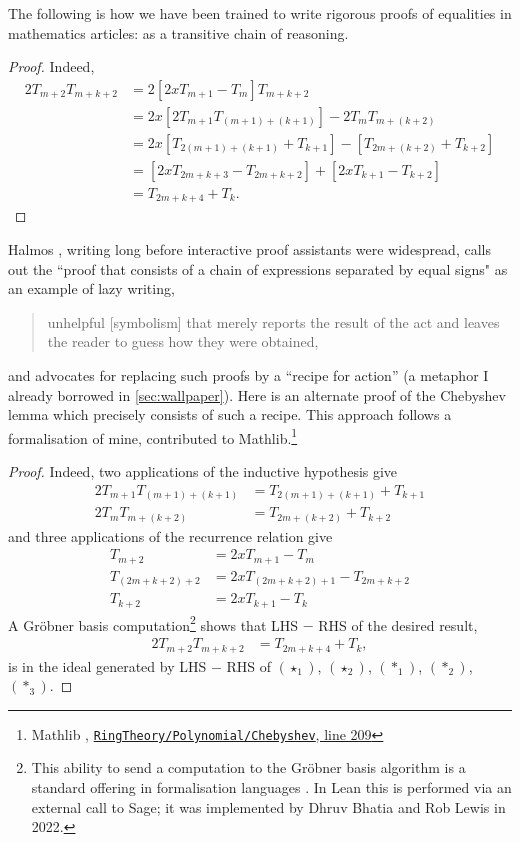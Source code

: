 \documentclass[12pt]{llncs}
\begin{document}
The following is how we have been trained to write rigorous proofs of equalities in mathematics articles:
as a transitive chain of reasoning.

  \begin{proof}
Indeed,
\begin{align*}
2T_{m+2}T_{m+k+2}
&=2[2xT_{m+1}-T_m]T_{m+k+2}\\
&=2x[2T_{m+1}T_{(m+1)+(k+1)}]-2T_mT_{m+(k+2)}\\
&=2x[T_{2(m+1)+(k+1)}+T_{k+1}]-[T_{2m+(k+2)}+T_{k+2}]\\
&=[2xT_{2m+k+3}-T_{2m+k+2}]+[2xT_{k+1}-T_{k+2}]\\
&=T_{2m+k+4}+T_{k}.
\end{align*}
  \end{proof}



Halmos \cite[section 16]{Hal70},
writing long before interactive proof assistants were widespread,
 calls out the ``proof that consists of a chain of expressions separated by equal signs"
as an example of lazy writing,
\begin{quote}
unhelpful [symbolism]
that merely reports the result of the act and leaves the reader to guess how they were obtained, 
\end{quote}
and advocates for replacing such proofs by a ``recipe for action''
(a metaphor I already borrowed in \cref{sec:wallpaper}).
Here is an alternate proof of the Chebyshev lemma which precisely consists of such a recipe.
This approach follows a formalisation of mine, contributed to Mathlib.\footnote{
  Mathlib \cite{Mathlib}, \href{https://github.com/leanprover-community/mathlib4/blob/21b3a48ba0f69a4ae9eb44dbacbc4de43a6290bf/Mathlib/RingTheory/Polynomial/Chebyshev.lean\#L209}{\texttt{RingTheory/Polynomial/Chebyshev}, line 209}
}
\begin{proof}
  Indeed, two applications of the inductive hypothesis give
\begin{align}
  2T_{m+1}T_{(m+1)+(k+1)}&=T_{2(m+1)+(k+1)}+T_{k+1}\tag{$\star_1$}\\
  2T_mT_{m+(k+2)}&=T_{2m+(k+2)}+T_{k+2}\tag{$\star_2$}
\end{align}
and three applications of the recurrence relation give
\begin{align*}
T_{m+2}&=2xT_{m+1}-T_m\tag{$*_1$}\\
T_{(2m+k+2)+2}&=2xT_{(2m+k+2)+1}-T_{2m+k+2}\tag{$*_2$}\\
T_{k+2}&=2xT_{k+1}-T_{k}\tag{$*_3$}
\end{align*}
A Gr\"obner basis computation\footnote{
  This ability to send a computation to the Gr\"obner basis algorithm
  is a standard offering in formalisation languages \cite{Har07,CW07,Pot08}.
  In Lean this is performed via an external call to Sage;
  it was implemented by Dhruv Bhatia and Rob Lewis in 2022.}
shows that LHS $-$ RHS of the desired result,
\begin{align*}
2T_{m+2}T_{m+k+2}&=T_{2m+k+4}+T_{k},
\end{align*}
is in the ideal generated by LHS $-$ RHS of $(\star_1)$, $(\star_2)$, $(*_1)$, $(*_2)$, $(*_3)$.
\end{proof}
\end{document}
